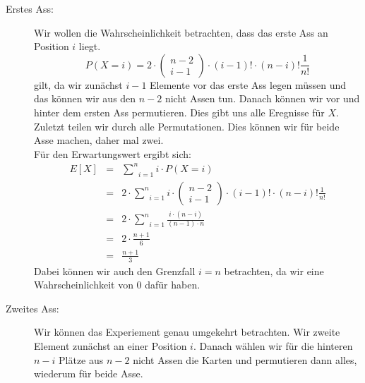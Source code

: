 \documentclass[11pt,a4paper,ngerman]{article}
\begin{document}
\begin{description}

    \item[Erstes Ass:] Wir wollen die Wahrscheinlichkeit betrachten, dass das erste Ass an Position $i$ liegt.
        \[
            P(X=i) = 2 \cdot \begin{pmatrix} n - 2 \\ i - 1\end{pmatrix} \cdot (i-1)! \cdot (n-i)! \frac{1}{n!}
        \]
        gilt, da wir zunächst $i-1$ Elemente vor das erste Ass legen müssen und das können wir aus den $n-2$ nicht Assen tun.
        Danach können wir vor und hinter dem ersten Ass permutieren. Dies gibt uns alle Eregnisse für $X$. Zuletzt teilen wir
        durch alle Permutationen. Dies können wir für beide Asse machen, daher mal zwei.\\

        Für den Erwartungswert ergibt sich:
        \[\begin{array}{rcl}
            E[X] &=& \underset{i=1}{\overset{n}{\sum}} i \cdot P(X=i)\\
                &=& 2\cdot\underset{i=1}{\overset{n}{\sum}} i \cdot \begin{pmatrix} n - 2 \\ i - 1\end{pmatrix} \cdot (i-1)! \cdot (n-i)! \frac{1}{n!}\\
                &=& 2\cdot\underset{i=1}{\overset{n}{\sum}} \frac{i\cdot (n-i)}{(n-1)\cdot n}\\
                &=& 2\cdot \frac{n+1}{6}\\
                &=& \frac{n+1}{3}
        \end{array}\]
        Dabei können wir auch den Grenzfall $i=n$ betrachten, da wir eine Wahrscheinlichkeit von $0$ dafür haben.
    \item[Zweites Ass:]
        Wir können das Experiement genau umgekehrt betrachten. Wir zweite Element zunächst an einer Position $i$. Danach wählen wir
        für die hinteren $n-i$ Plätze aus $n-2$ nicht Assen die Karten und permutieren dann alles, wiederum für beide Asse.


\end{description}
\end{document}
